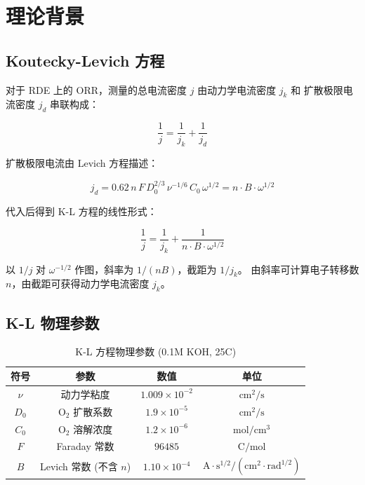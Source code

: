 \documentclass[12pt,a4paper]{ctexart}
\begin{document}
\newpage

\section{理论背景}

\subsection{Koutecky-Levich 方程}

对于 RDE 上的 ORR，测量的总电流密度 $j$ 由动力学电流密度 $j_k$ 和
扩散极限电流密度 $j_d$ 串联构成：

\begin{equation}
\frac{1}{j} = \frac{1}{j_k} + \frac{1}{j_d}
\label{eq:kl}
\end{equation}

扩散极限电流由 Levich 方程描述\cite{bard2001}：

\begin{equation}
j_d = 0.62\, n\, F\, D_0^{2/3}\, \nu^{-1/6}\, C_0\, \omega^{1/2}
   = n \cdot B \cdot \omega^{1/2}
\label{eq:levich}
\end{equation}

代入后得到 K-L 方程的线性形式：

\begin{equation}
\boxed{\frac{1}{j} = \frac{1}{j_k} + \frac{1}{n \cdot B \cdot \omega^{1/2}}}
\label{eq:kl_linear}
\end{equation}

以 $1/j$ 对 $\omega^{-1/2}$ 作图，斜率为 $1/(nB)$，截距为 $1/j_k$。
由斜率可计算电子转移数 $n$，由截距可获得动力学电流密度 $j_k$。

\subsection{K-L 物理参数}

\begin{table}[h]
\centering
\caption{K-L 方程物理参数 (0.1M KOH, 25\textdegree C)}
\begin{tabular}{cccc}
\toprule
符号 & 参数 & 数值 & 单位 \\
\midrule
$\nu$ & 动力学粘度 & $1.009 \times 10^{-2}$ & $\text{cm}^2/\text{s}$ \\
$D_0$ & O$_2$ 扩散系数 & $1.9 \times 10^{-5}$ & $\text{cm}^2/\text{s}$ \\
$C_0$ & O$_2$ 溶解浓度 & $1.2 \times 10^{-6}$ & $\text{mol}/\text{cm}^3$ \\
$F$ & Faraday 常数 & $96485$ & $\text{C}/\text{mol}$ \\
$B$ & Levich 常数 (不含 $n$) & $1.10 \times 10^{-4}$ & $\text{A}\!\cdot\!\text{s}^{1/2}/(\text{cm}^2\!\cdot\!\text{rad}^{1/2})$ \\
\bottomrule
\end{tabular}
\end{table}
\end{document}
